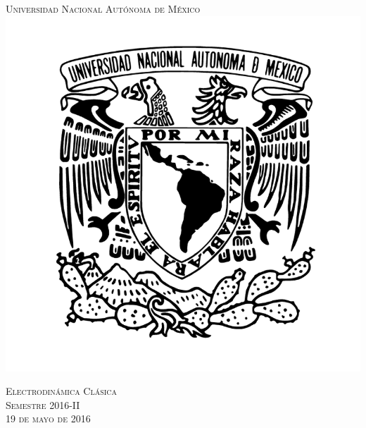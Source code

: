 \documentclass[a4paper,11pt]{article}
\numberwithin{equation}{section}
\begin{document}
\begin{titlepage}
\thispagestyle{fancy}

\newcommand{\HRule}{\rule{\linewidth}{0.5mm}} %

\center %
 

\textsc{\LARGE Universidad Nacional Autónoma de México}\\[0.3cm] %


\includegraphics[scale=0.17]{unam}


\textsc{\Large Electrodinámica Clásica}\\[0.3cm] %
\textsc{\large Semestre 2016-II}\\[0.3cm] %
\textsc{\large 19 de mayo de 2016}\\ %


\end{titlepage}
\end{document}
